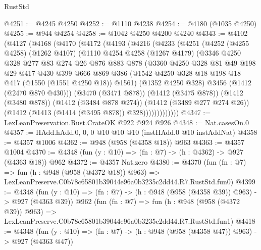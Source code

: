 \begin{lexlean}{RustStd}
\begin{coremodule}
@4251 := @4245 @4250
@4252 := @1110 @4238
@4254 := @4180 (@1035 @4250)
@4255 := @944 @4254
@4258 := @1042 @4250 @4200 @4240
@4343 := @4102
    (@4127
      (@4168
        (@4170
          (@4172
            (@4193
              (@4216
                (@4233
                  (@4251
                    (@4252
                      (@4255 @4258)
                      (@1262 @4107)
                      (@1110
                        @4254
                        @4258
                        (@1267 @4179)
                        (@3346
                          @4250
                          @328
                          @277
                          @83
                          @274
                          @26
                          @876
                          @883
                          @878
                          (@3360
                            @4250
                            @328
                            @81
                            @49
                            @198
                            @29
                            @417
                            @430
                            @399
                            @666
                            @869
                            @386
                            (@1542 @4250 @328 @18 @198 @18 @417 (@1550 (@1551 @4250 @18)) @1561)
                            (@1352 @4250 @328)
                            @3456
                            (@1412 (@2470 @870 @430)))
                          (@3470 (@3471 @878))
                          (@1412 (@3475 @878))
                          (@1412 (@3480 @878))
                          (@1412 (@3484 @878 @274))
                          (@1412 (@3489 @277 @274 @26))
                          (@1412 (@1413 (@1414 (@3495 @878)) @328)))))))))))))
@4347 := LexLeanPreservation.Rust.CrateOK @922 @924 @926
@4348 := Nat.casesOn.{0}
@4357 := HAdd.hAdd.{0, 0, 0} @10 @10 @10 (instHAdd.{0} @10 instAddNat)
@4358 := @4357 @1006
@4362 := @948 (@958 (@4358 @18)) @963
@4363 := @4357 @1004
@4370 := @4348 (fun (y : @10) => (fn : @7) -> (h : @4362) -> @927 (@4363 @18)) @962
@4372 := @4357 Nat.zero
@4380 := @4370
    (fun (fn : @7) =>
    fun (h : @948 (@958 (@4372 @18)) @963) =>
    LexLeanPreserve.C0b78c65801b39044e96a0b3235c2dd44.R7.RustStd.fun0)
@4399 := @4348
    (fun (y : @10) => (fn : @7) -> (h : @948 (@958 (@4358 @39)) @963) -> @927 (@4363 @39))
    @962
    (fun (fn : @7) =>
    fun (h : @948 (@958 (@4372 @39)) @963) =>
    LexLeanPreserve.C0b78c65801b39044e96a0b3235c2dd44.R7.RustStd.fun1)
@4418 := @4348
    (fun (y : @10) => (fn : @7) -> (h : @948 (@958 (@4358 @47)) @963) -> @927 (@4363 @47))

\end{coremodule}
\end{lexlean}
